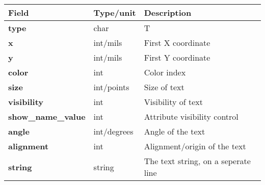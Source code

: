 \documentclass{article}
\begin{document}
\begin{table}[h]
\begin{tabular}{|l|l|l|} \hline
Field 		& Type/unit 	& Description \\ \hline 
\hline
{\bf type} 	& char 		& T \\ \hline
{\bf x} 	& int/mils	& First X coordinate \\ \hline
{\bf y} 	& int/mils	& First Y coordinate \\ \hline
{\bf color} 	& int		& Color index \\ \hline
{\bf size} 	& int/points	& Size of text \\ \hline
{\bf visibility}& int		& Visibility of text \\ \hline
{\bf show\_name\_value} & int	& Attribute visibility control \\ \hline
{\bf angle} 	& int/degrees	& Angle of the text \\ \hline
{\bf alignment} & int		& Alignment/origin of the text \\ \hline
{\bf string} 	& string	& The text string, on a seperate line \\ \hline
\end{tabular}
\end{table}
\end{document}
